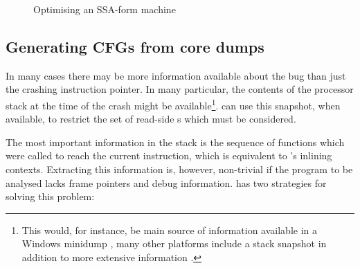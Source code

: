 \begin{figure}
\caption{Optimising an SSA-form machine}
\label{fig:ssa_cfg1}
\end{figure}

\subsection{Generating CFGs from core dumps}
\label{sect:derive:from_core_dump}

In many cases there may be more information available about the bug
than just the crashing instruction pointer.  In many particular, the
contents of the processor stack at the time of the crash might be
available\footnote{This would, for instance, be main source of
  information available in a Windows minidump , many other
  platforms include a stack snapshot in addition to more extensive
  information .}.  {\Technique} can use
this snapshot, when available, to restrict the set of read-side
s which must be considered.

The most important information in the stack is the sequence of
functions which were called to reach the current instruction, which is
equivalent to {\technique}'s inlining contexts.  Extracting this
information is, however, non-trivial if the program to be analysed
lacks frame pointers and debug information.  {\Technique} has two
strategies for solving this problem:

